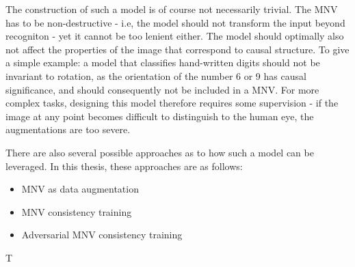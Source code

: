 		The construction of such a model is of course not necessarily trivial. The MNV has to be non-destructive - i.e, the model should not transform the input beyond recogniton - yet it cannot be too lenient either. The model should optimally also not affect the properties of the image that correspond to causal structure. To give a simple example: a model that classifies hand-written digits should not be invariant to rotation, as the orientation of the number 6 or 9 has causal significance, and should consequently not be included in a MNV. For more complex tasks, designing this model therefore requires some supervision - if the image at any point becomes difficult to distinguish to the human eye, the augmentations are too severe. 
	
		There are also several possible approaches as to how such a model can be leveraged. In this thesis, these approaches are as follows:
		\begin{itemize}
			\item MNV as data augmentation
			\item MNV consistency training
			\item Adversarial MNV consistency training
		\end{itemize}
	
		T